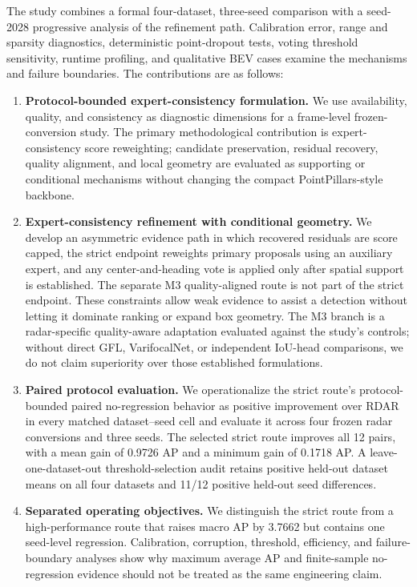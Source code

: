 \documentclass[preprint,12pt,times]{elsarticle}
\begin{document}
The study combines a formal four-dataset, three-seed comparison with a
seed-2028 progressive analysis of the refinement path. Calibration error,
range and sparsity diagnostics, deterministic point-dropout tests, voting
threshold sensitivity, runtime profiling, and qualitative BEV cases examine
the mechanisms and failure boundaries. The contributions are as follows:
\begin{enumerate}[leftmargin=*]
\item \textbf{Protocol-bounded expert-consistency formulation.} We use
availability, quality, and consistency as diagnostic dimensions for a
frame-level frozen-conversion study. The primary methodological contribution
is expert-consistency score reweighting; candidate preservation, residual
recovery, quality alignment, and local geometry are evaluated as supporting or
conditional mechanisms without changing the compact PointPillars-style backbone.
\item \textbf{Expert-consistency refinement with conditional geometry.} We develop
an asymmetric evidence path in which recovered residuals are score capped, the
strict endpoint reweights primary proposals using an auxiliary expert, and any
center-and-heading vote is applied only after spatial support is established.
The separate M3 quality-aligned route is not part of the strict endpoint. These constraints
allow weak evidence to assist a detection without letting it dominate ranking
or expand box geometry.
The M3 branch is a radar-specific quality-aware adaptation evaluated against
the study's controls; without direct GFL, VarifocalNet, or independent IoU-head
comparisons, we do not claim superiority over those established formulations.
\item \textbf{Paired protocol evaluation.} We operationalize the strict
route's protocol-bounded paired no-regression behavior as positive improvement over RDAR in every matched dataset--seed
cell and evaluate it across four frozen radar conversions and three seeds. The selected
strict route improves all 12 pairs, with a mean gain of 0.9726 AP and a minimum
gain of 0.1718 AP. A leave-one-dataset-out threshold-selection audit retains
positive held-out dataset means on all four datasets and 11/12 positive
held-out seed differences.
\item \textbf{Separated operating objectives.} We distinguish the strict route
from a high-performance route that raises macro AP by 3.7662 but contains one
seed-level regression. Calibration, corruption, threshold, efficiency, and
failure-boundary analyses show why maximum average AP and finite-sample
no-regression evidence should not be treated as the same engineering claim.
\end{enumerate}
\end{document}
